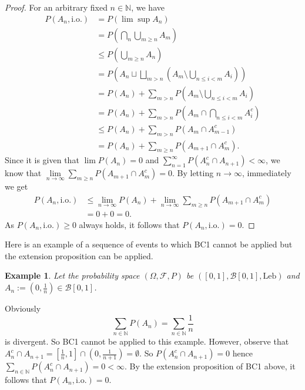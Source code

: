 \documentclass[a4paper, linespread=1.5]{article}
\newtheorem{example}[theorem]{Example}
\newcommand{\Natural}{\mathbb{N}}
\newcommand{\BorelSet}{\mathcal{B}}
\begin{document}
    \begin{proof}
        For an arbitrary fixed $n \in \Natural$, we have
        \begin{align*}
            P(A_n, \textrm{i.o.}) &= P(\lim \sup A_n) \\
            &= P(\bigcap_n \bigcup_{m \geqslant n} A_m) \\
            &\leqslant P(\bigcup_{m \geqslant n} A_n) \\
            &= P(A_n \sqcup \bigsqcup_{m > n}(A_m \setminus \bigcup_{n \leqslant i < m}A_i)) \\
            &= P(A_n) + \sum_{m > n} P(A_m \setminus \bigcup_{n \leqslant i < m}A_i) \\
            &= P(A_n) + \sum_{m > n} P(A_m \cap \bigcap_{n \leqslant i < m} A_i^c) \\
            &\leqslant P(A_n) + \sum_{m > n} P(A_m \cap A_{m - 1}^c) \\
            &= P(A_n) + \sum_{m \geqslant n} P(A_{m + 1} \cap A_m^c).
        \end{align*}
        Since it is given that $\lim P(A_n) = 0$ and $\sum\limits_{n = 1}^{\infty} P(A_n^c \cap A_{n + 1}) < \infty$, we know that $\lim\limits_{n \rightarrow \infty} \sum\limits_{m \geqslant n} P(A_{m + 1} \cap A_m^c) = 0$. By letting $n \rightarrow \infty$, immediately we get
        \begin{align*}
            P(A_n, \textrm{i.o.}) &\leqslant \lim_{n \rightarrow \infty} P(A_n) + \lim_{n \rightarrow \infty} \sum_{m \geqslant n} P(A_{m + 1} \cap A_m^c) \\
            &= 0 + 0 = 0.
        \end{align*}
        As $P(A_n, \textrm{i.o.}) \geqslant 0$ always holds, it follows that $P(A_n, \textrm{i.o.}) = 0$.
    \end{proof}

    \medskip
    
    Here is an example of a sequence of events to which BC1 cannot be applied but the extension proposition can be applied.
    \begin{example}
        Let the probability space $(\Omega, \mathcal{F}, P)$ be $([0, 1], \BorelSet[0, 1], \textrm{Leb})$ and $A_n := (0, \frac{1}{n}) \in \BorelSet[0, 1]$.
    \end{example}
    Obviously
    $$
    \sum_{n \in \Natural} P(A_n) = \sum_{n \in \Natural} \frac{1}{n}
    $$
    is divergent. So BC1 cannot be applied to this example. However, observe that $A_n^c \cap A_{n + 1} = [\frac{1}{n}, 1] \cap (0, \frac{1}{n + 1}) = \emptyset$. So $P(A_n^c \cap A_{n + 1}) = 0$ hence $\sum\limits_{n \in \Natural} P(A_n^c \cap A_{n + 1}) = 0 < \infty$. By the extension proposition of BC1 above, it follows that $P(A_n, \textrm{i.o.}) = 0$.
    
\end{document}

